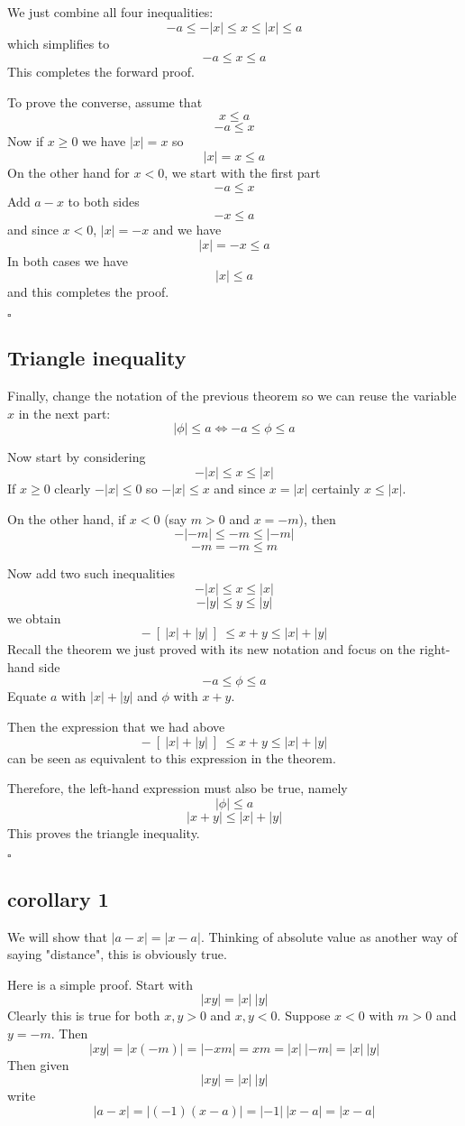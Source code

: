 \documentclass[11pt, oneside]{article}
\begin{document}
We just combine all four inequalities:
\[ -a \le -|x| \le x \le |x| \le a \]
which simplifies to
\[ -a \le x \le a \]
This completes the forward proof.

To prove the converse, assume that
\[ x \le a \]
\[ - a \le x \]
Now if $x \ge 0$ we have $|x| = x$ so
\[ |x| = x \le a \]
On the other hand for $x < 0$, we start with the first part
\[ -a \le x \]
Add $a - x$ to both sides
\[ -x \le a \]
and since $x < 0$, $|x| = -x$ and we have 
\[ |x| =  -x \le a \]
In both cases we have \[ |x| \le a \]
and this completes the proof.

$\square$

\subsection*{Triangle inequality}
Finally, change the notation of the previous theorem so we can reuse the variable $x$ in the next part:
\[ | \phi | \le a \iff -a \le \phi \le a \]

Now start by considering
\[ - |x| \le x \le |x| \]
If $x \ge 0$ clearly $-|x| \le 0$ so $-|x| \le x$ and since $x = |x|$ certainly $x \le |x|$.

On the other hand, if $x < 0$ (say $m > 0$ and $x = -m$), then
\[ - |-m| \le -m \le |-m| \]
\[ - m = -m \le m \]

Now add two such inequalities 
\[ - |x| \le x \le |x| \]
\[ - |y| \le y \le |y| \]
we obtain
\[ - \ [ \ |x| +  |y| \ ] \  \le x + y \le  |x| + |y|  \]
Recall the theorem we just proved with its new notation and focus on the right-hand side
\[  -a \le \phi \le a \]
Equate $a$ with $|x| + |y|$ and $\phi$ with $x + y$.  

Then the expression that we had above
\[ - \ [ \ |x| +  |y| \ ] \  \le x + y \le  |x| + |y|  \]
can be seen as equivalent to this expression in the theorem.  

Therefore, the left-hand expression must also be true, namely
\[ |\phi| \le a \]
\[ |x + y| \le  |x| +  |y| \]
This proves the triangle inequality.

$\square$

\subsection*{corollary 1}
We will show that $|a - x| = |x - a|$.  Thinking of absolute value as another way of saying "distance", this is obviously true.

Here is a simple proof.  Start with
\[ |xy| = |x| \ |y| \]
Clearly this is true for both $x,y > 0$ and $x,y < 0$.  Suppose $x < 0$ with $m > 0$ and $y = - m$.  Then
\[ |xy| = |x (-m)| = |-xm| = xm = |x| \ |-m| = |x| \ |y| \]
Then given
\[ |xy| = |x| \ |y| \]
write
\[ |a - x| = |(-1)(x - a)| = |-1| \ |x - a| = |x - a| \]
\end{document}

